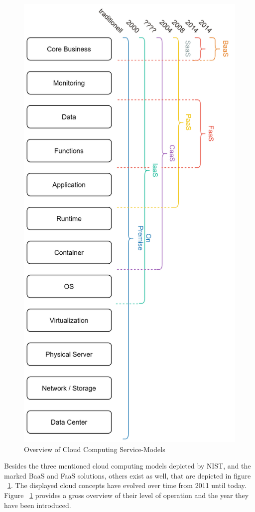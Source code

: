 \documentclass[11pt]{article}
\begin{document}
\begin{figure}[H]
\caption{Overview of Cloud Computing Service-Models}
\label{fig:cloudComputingConcepts}
\centering
\includegraphics[angle=90,width=1\textwidth]{serviceModels}
\end{figure}
Besides the three mentioned cloud computing models depicted by NIST, and the marked BaaS and FaaS solutions, others exist as well, that are depicted in figure ~\ref{fig:cloudComputingConcepts}. The displayed cloud concepts have evolved over time from 2011 until today. Figure ~\ref{fig:cloudComputingConcepts} provides a gross overview of their level of operation and the year they have been introduced. 
\end{document}
